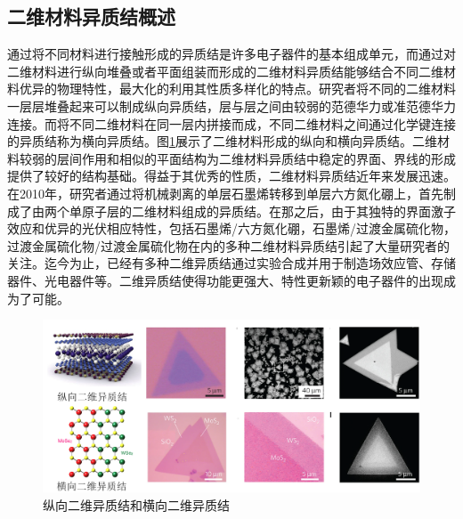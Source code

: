 \subsection{二维材料异质结概述}

    通过将不同材料进行接触形成的异质结是许多电子器件的基本组成单元，而通过对二维材料进行纵向堆叠或者平面组装而形成的二维材料异质结能够结合不同二维材料优异的物理特性，最大化的利用其性质多样化的特点。研究者将不同的二维材料一层层堆叠起来可以制成纵向异质结，层与层之间由较弱的范德华力或准范德华力连接。而将不同二维材料在同一层内拼接而成，不同二维材料之间通过化学键连接的异质结称为横向异质结。图\ref{fig:intro_v-l-hetero}展示了二维材料形成的纵向和横向异质结。二维材料较弱的层间作用和相似的平面结构为二维材料异质结中稳定的界面、界线的形成提供了较好的结构基础。得益于其优秀的性质，二维材料异质结近年来发展迅速。在2010年，研究者通过将机械剥离的单层石墨烯转移到单层六方氮化硼上，首先制成了由两个单原子层的二维材料组成的异质结。在那之后，由于其独特的界面激子效应和优异的光伏相应特性，包括石墨烯/六方氮化硼，石墨烯/过渡金属硫化物，过渡金属硫化物/过渡金属硫化物在内的多种二维材料异质结引起了大量研究者的关注。迄今为止，已经有多种二维异质结通过实验合成并用于制造场效应管、存储器件、光电器件等。二维异质结使得功能更强大、特性更新颖的电子器件的出现成为了可能。

    \begin{figure}[htb]
        \includegraphics{pic/INTRO_heterostructure_VertAndLate.png}
        \caption{纵向二维异质结和横向二维异质结}
        \label{fig:intro_v-l-hetero}
    \end{figure}


